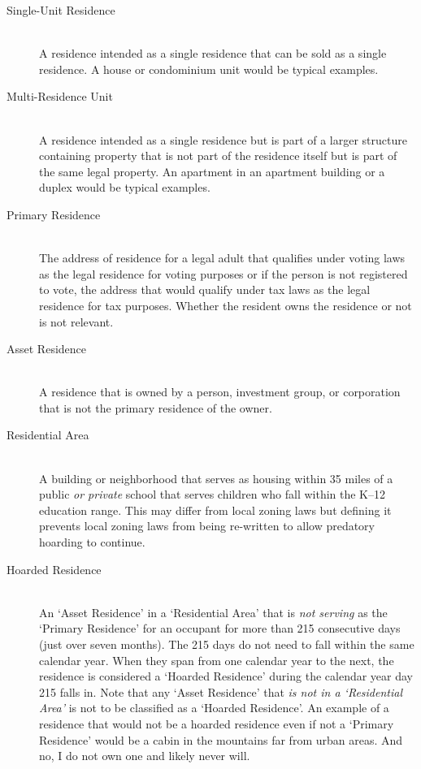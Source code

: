 \begin{description}
  \item[Single-Unit Residence] \hfill \\ A residence intended as a single residence that can be sold as a single residence. A house or condominium unit would be typical examples.
  \item[Multi-Residence Unit] \hfill \\ A residence intended as a single residence but is part of a larger structure containing property that is not part of the residence itself but is part of the same legal property. An apartment in an apartment building or a duplex would be typical examples.
  \item[Primary Residence] \hfill \\ The address of residence for a legal adult that qualifies under voting laws as the legal residence for voting purposes or if the person is not registered to vote, the address that would qualify under tax laws as the legal residence for tax purposes. Whether the resident owns the residence or not is not relevant.
  \item[Asset Residence] \hfill \\ A residence that is owned by a person, investment group, or corporation that is not the primary residence of the owner.
  \item[Residential Area] \hfill \\ A building or neighborhood that serves as housing within 35 miles of a public \emph{or private} school that serves children who fall within the K--12 education range. This may differ from local zoning laws but defining it prevents local zoning laws from being re-written to allow predatory hoarding to continue.
  \item[Hoarded Residence] \hfill \\ An `Asset Residence' in a `Residential Area' that is \emph{not serving} as the `Primary Residence' for an occupant for more than 215 consecutive days (just over seven months). The 215 days do not need to fall within the same calendar year. When they span from one calendar year to the next, the residence is considered a `Hoarded Residence' during the calendar year day 215 falls in. Note that any `Asset Residence' that \emph{is not in a `Residential Area'} is not to be classified as a `Hoarded Residence'. An example of a residence that would not be a hoarded residence even if not a `Primary Residence' would be a cabin in the mountains far from urban areas. And no, I do not own one and likely never will.
\end{description}

